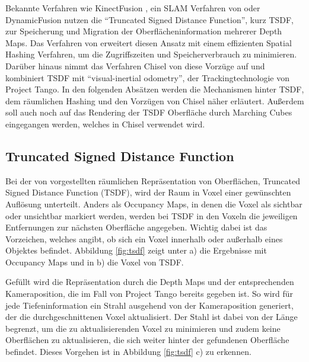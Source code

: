 Bekannte Verfahren wie KinectFusion \citep{newcombe2011kinectfusion}, ein SLAM Verfahren von \citet{bylow2013real} oder DynamicFusion \citep{newcombe2015dynamicfusion} nutzen die \enquote{Truncated Signed Distance Function}, kurz TSDF, zur Speicherung und Migration der Oberflächeninformation mehrerer Depth Maps. Das Verfahren von \citet{niessner2013real} erweitert diesen Ansatz mit einem effizienten Spatial Hashing Verfahren, um die Zugriffszeiten und Speicherverbrauch zu minimieren. Darüber hinaus nimmt das Verfahren Chisel von \citep{Klingensmith_2015_7924} diese Vorzüge auf und kombiniert TSDF mit \enquote{visual-inertial odometry}, der Trackingtechnologie von Project Tango. In den folgenden Absätzen werden die Mechanismen hinter TSDF, dem räumlichen Hashing und den Vorzügen von Chisel näher erläutert. Außerdem soll auch noch auf das Rendering der TSDF Oberfläche durch Marching Cubes eingegangen werden, welches in Chisel verwendet wird. 


\subsection{Truncated Signed Distance Function}

Bei der von \citet{curless1996volumetric} vorgestellten räumlichen Repräsentation von Oberflächen, Truncated Signed Distance Function (TSDF), wird der Raum in Voxel einer gewünschten Auflösung unterteilt. Anders als Occupancy Maps, in denen die Voxel als sichtbar oder unsichtbar markiert werden, werden bei TSDF in den Voxeln die jeweiligen Entfernungen zur nächsten Oberfläche angegeben. Wichtig dabei ist das Vorzeichen, welches angibt, ob sich ein Voxel innerhalb oder außerhalb eines Objektes befindet. Abbildung \ref{fig:tsdf} zeigt unter a) die Ergebnisse mit Occupancy Maps und in b) die Voxel von TSDF. \citep{curless1996volumetric} 

Gefüllt wird die Repräsentation durch die Depth Maps und der entsprechenden Kameraposition, die im Fall von Project Tango bereits gegeben ist. So wird für jede Tiefeninformation ein Strahl ausgehend von der Kameraposition generiert, der die durchgeschnittenen Voxel aktualisiert. Der Stahl ist dabei von der Länge begrenzt, um die zu aktualisierenden Voxel zu minimieren und zudem keine Oberflächen zu aktualisieren, die sich weiter hinter der gefundenen Oberfläche befindet. Dieses Vorgehen ist in Abbildung \ref{fig:tsdf} c) zu erkennen. \citep{Compu66:online} 

